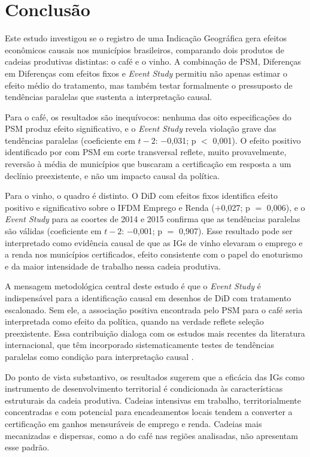 \documentclass[12pt, a4paper]{article}
\begin{document}
\section{Conclusão}

Este estudo investigou se o registro de uma Indicação Geográfica gera efeitos econômicos causais nos municípios brasileiros, comparando dois produtos de cadeias produtivas distintas: o café e o vinho. A combinação de PSM, Diferenças em Diferenças com efeitos fixos e \textit{Event Study} permitiu não apenas estimar o efeito médio do tratamento, mas também testar formalmente o pressuposto de tendências paralelas que sustenta a interpretação causal.

Para o café, os resultados são inequívocos: nenhuma das oito especificações do PSM produz efeito significativo, e o \textit{Event Study} revela violação grave das tendências paralelas (coeficiente em $t{-}2$: $-$0,031; p $<$ 0,001). O efeito positivo identificado por \citet{medeiros2021raiher} com PSM em corte transversal reflete, muito provavelmente, reversão à média de municípios que buscaram a certificação em resposta a um declínio preexistente, e não um impacto causal da política.

Para o vinho, o quadro é distinto. O DiD com efeitos fixos identifica efeito positivo e significativo sobre o IFDM Emprego e Renda ($+$0,027; p $=$ 0,006), e o \textit{Event Study} para as coortes de 2014 e 2015 confirma que as tendências paralelas são válidas (coeficiente em $t{-}2$: $-$0,001; p $=$ 0,907). Esse resultado pode ser interpretado como evidência causal de que as IGs de vinho elevaram o emprego e a renda nos municípios certificados, efeito consistente com o papel do enoturismo e da maior intensidade de trabalho nessa cadeia produtiva.

A mensagem metodológica central deste estudo é que o \textit{Event Study} é indispensável para a identificação causal em desenhos de DiD com tratamento escalonado. Sem ele, a associação positiva encontrada pelo PSM para o café seria interpretada como efeito da política, quando na verdade reflete seleção preexistente. Essa contribuição dialoga com os estudos mais recentes da literatura internacional, que têm incorporado sistematicamente testes de tendências paralelas como condição para interpretação causal \citep{desimone2024, crescenzi2022}.

Do ponto de vista substantivo, os resultados sugerem que a eficácia das IGs como instrumento de desenvolvimento territorial é condicionada às características estruturais da cadeia produtiva. Cadeias intensivas em trabalho, territorialmente concentradas e com potencial para encadeamentos locais tendem a converter a certificação em ganhos mensuráveis de emprego e renda. Cadeias mais mecanizadas e dispersas, como a do café nas regiões analisadas, não apresentam esse padrão.
\end{document}
